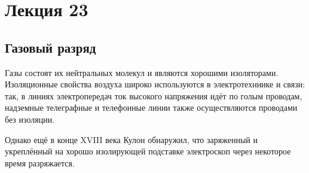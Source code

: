 \documentclass[a4paper,10pt]{book}
\begin{document}
\chapter{Лекция 23}
\section*{Газовый разряд}

Газы состоят их нейтральных молекул и являются хорошими изоляторами. Изоляционные свойства воздуха широко используются в электротехниике и связи: так, в линиях электропередач ток высокого напряжения идёт по голым проводам, надземные телеграфные и телефонные линии также осуществляются проводами без изоляции.

Однако ещё в конце XVIII века Кулон обнаружил, что заряженный и укреплённый на хорошо изолирующей подставке электроскоп через некоторое время разряжается. 
\end{document}
